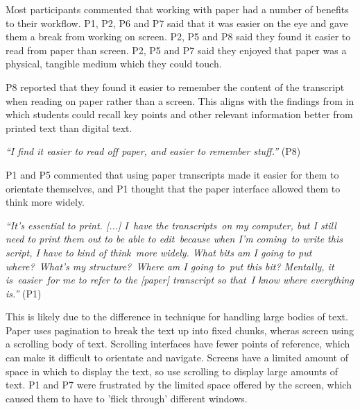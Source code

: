 
Most participants commented that working with paper had a number of benefits to their workflow. P1, P2, P6 and P7 said
that it was easier on the eye and gave them a break from working on screen. P2, P5 and P8 said they found it easier to
read from paper than screen. P2, P5 and P7 said they enjoyed that paper was a physical, tangible medium which they
could touch.

P8 reported that they found it easier to remember the content of the transcript when reading on paper rather than a
screen.  This aligns with the findings from \citet{Singer2017} in which students could recall key points and other
relevant information better from printed text than digital text.




\textit{``I find it easier to read off paper, and easier to remember stuff.''} (P8)

P1 and P5 commented that using paper transcripts made it easier for them to orientate themselves, and
P1 thought that the paper interface allowed them to think more widely.

\textit{``It's essential to print. [...]
  I have the transcripts on my computer, but I still need to print them out to be able to edit because when I'm
  coming to write this script, I have to kind of think more widely. What bits am I going to put where? What's my
  structure? Where am I going to put this bit? Mentally, it is easier for me to refer to the [paper] transcript so
that I know where everything is.''} (P1)

This is likely due to the difference in technique for handling large bodies of text. Paper uses pagination to break the
text up into fixed chunks, wheras screen using a scrolling body of text. Scrolling interfaces have fewer points of
reference, which can make it difficult to orientate and navigate.  Screens have a limited amount of space in which to
display the text, so use scrolling to display large amounts of text.  P1 and P7 were frustrated by the limited space
offered by the screen, which caused them to have to 'flick through' different windows.

